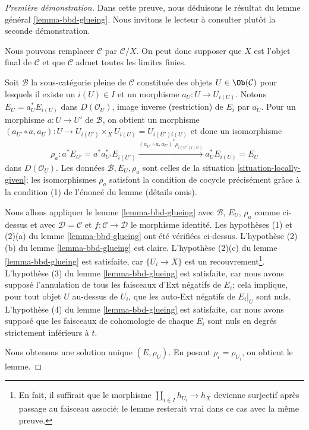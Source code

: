 \begin{proof}[Première démonstration]
Dans cette preuve, nous déduisons le résultat du lemme général
\ref{lemma-bbd-glueing}. Nous invitons le lecteur à consulter plutôt
la seconde démonstration.

\medskip\noindent
Nous pouvons remplacer $\mathcal{C}$ par $\mathcal{C}/X$.
On peut donc supposer que $X$ est l'objet final de $\mathcal{C}$
et que $\mathcal{C}$ admet toutes les limites finies.

\medskip\noindent
Soit $\mathcal{B}$ la sous-catégorie pleine de $\mathcal{C}$
constituée des objets $U \in \Ob(\mathcal{C})$ pour lesquels il existe
un $i(U) \in I$ et un morphisme $a_U : U \to U_{i(U)}$.
Notons $E_U = a_U^*E_{i(U)}$ dans $D(\mathcal{O}_U)$,
image inverse (restriction) de $E_i$ par $a_U$.
Pour un morphisme $a : U \to U'$ de $\mathcal{B}$,
on obtient un morphisme
$(a_{U'} \circ a, a_U) : U \to U_{i(U')} \times_X U_{i(U)} = U_{i(U')i(U)}$
et donc un isomorphisme
$$
\rho_a :
a^*E_{U'} = a^*a_{U'}^*E_{i(U')}
\xrightarrow{(a_{U'} \circ a, a_U)^*\rho_{i(U')i(U)}}
a_{U}^*E_{i(U)} = E_{U}
$$
dans $D(\mathcal{O}_U)$. Les données $\mathcal{B}, E_U, \rho_a$
sont celles de la situation \ref{situation-locally-given}; les
isomorphismes $\rho_a$ satisfont la condition de cocycle
précisément grâce à la condition (1) de l'énoncé du lemme
(détails omis).

\medskip\noindent
Nous allons appliquer le lemme \ref{lemma-bbd-glueing} avec $\mathcal{B}$,
$E_U$, $\rho_a$ comme ci-dessus et avec $\mathcal{D} = \mathcal{C}$ et
$f : \mathcal{C} \to \mathcal{D}$ le morphisme identité.
Les hypothèses (1) et (2)(a) du lemme \ref{lemma-bbd-glueing} ont été vérifiées ci-dessus.
L’hypothèse (2)(b) du lemme \ref{lemma-bbd-glueing} est claire.
L'hypothèse (2)(c) du lemme \ref{lemma-bbd-glueing} est satisfaite, car
$\{U_i \to X\}$ est un recouvrement\footnote{En fait, il suffirait
que le morphisme $\coprod_{i \in I} h_{U_i} \to h_X$ devienne
surjectif après passage au faisceau associé; le lemme resterait vrai dans ce cas
avec la même preuve.}.
L'hypothèse (3) du lemme \ref{lemma-bbd-glueing} est satisfaite,
car nous avons supposé l'annulation de tous les faisceaux d'Ext négatifs
de $E_i$; cela implique, pour tout objet $U$ au-dessus de $U_i$, que
les auto-Ext négatifs de $E_i|_U$ sont nuls.
L'hypothèse (4) du lemme \ref{lemma-bbd-glueing} est satisfaite, car
nous avons supposé que les faisceaux de cohomologie de chaque $E_i$ sont nuls
en degrés strictement inférieurs à $t$.

\medskip\noindent
Nous obtenons une solution unique $(E, \rho_U)$.
En posant $\rho_i = \rho_{U_i}$, on obtient le lemme.
\end{proof}

